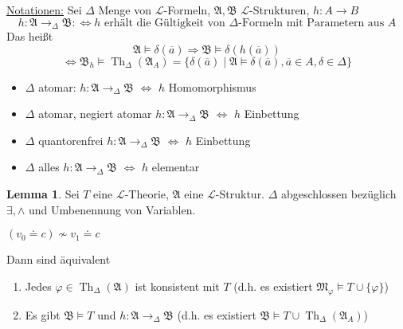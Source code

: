 \documentclass[12pt,parskip=full]{scrartcl}
\newcommand{\heading}{\underline}
\theoremstyle{definition}
\newtheorem{lemma}[theorem]{Lemma}
\begin{document}
	\heading{Notationen:} Sei $\Delta$ Menge von $\mathcal{L}$-Formeln, $\mathfrak{A}, \mathfrak{B}$ $\mathcal{L}$-Strukturen, $h: A \to B$
	\begin{equation*}
		h: \mathfrak{A} \to_\Delta \mathfrak{B} :\Leftrightarrow \text{$h$ erhält die Gültigkeit von $\Delta$-Formeln mit Parametern aus $A$}
	\end{equation*}
	Das heißt
	\begin{equation*}
		\mathfrak{A} \models \delta(\overline{a}) \Rightarrow \mathfrak{B} \models \delta(h(\overline{a}))
	\end{equation*}
	\begin{equation*}
		\Leftrightarrow \mathfrak{B}_h \models \operatorname{Th}_\Delta(\mathfrak{A}_A) = \{ \delta(\overline{a}) \mid \mathfrak{A} \models \delta(\overline{a}), \overline{a} \in A, \delta \in \Delta \}
	\end{equation*}
	
	\begin{itemize}
		\item $\Delta$ atomar: $h: \mathfrak{A} \to_\Delta \mathfrak{B}$ $\Leftrightarrow$ $h$ Homomorphismus
		\item $\Delta$ atomar, negiert atomar $h: \mathfrak{A} \to_\Delta \mathfrak{B}$ $\Leftrightarrow$ $h$ Einbettung
		\item $\Delta$ quantorenfrei $h: \mathfrak{A} \to_\Delta \mathfrak{B}$ $\Leftrightarrow$ $h$ Einbettung
		\item $\Delta$ alles $h: \mathfrak{A} \to_\Delta \mathfrak{B}$ $\Leftrightarrow$ $h$ elementar
	\end{itemize}

	\begin{lemma}
		Sei $T$ eine $\mathcal{L}$-Theorie, $\mathfrak{A}$ eine $\mathcal{L}$-Struktur. $\Delta$ abgeschlossen bezüglich $\exists, \land$ und Umbenennung von Variablen.
		
		$(v_0 \doteq c) \nsim v_1 \doteq c$
		
		Dann sind äquivalent
		\begin{enumerate}
			\item Jedes $\varphi \in \operatorname{Th}_\Delta(\mathfrak{A})$ ist konsistent mit $T$ (d.h. es existiert $\mathfrak{M}_\varphi \models T \cup \{ \varphi \}$)
			\item Es gibt $\mathfrak{B} \models T$ und $h: \mathfrak{A} \to_\Delta \mathfrak{B}$ (d.h. es existiert $\mathfrak{B} \models T \cup \operatorname{Th}_\Delta(\mathfrak{A}_A)$)
		\end{enumerate}
	\end{lemma}
\end{document}
